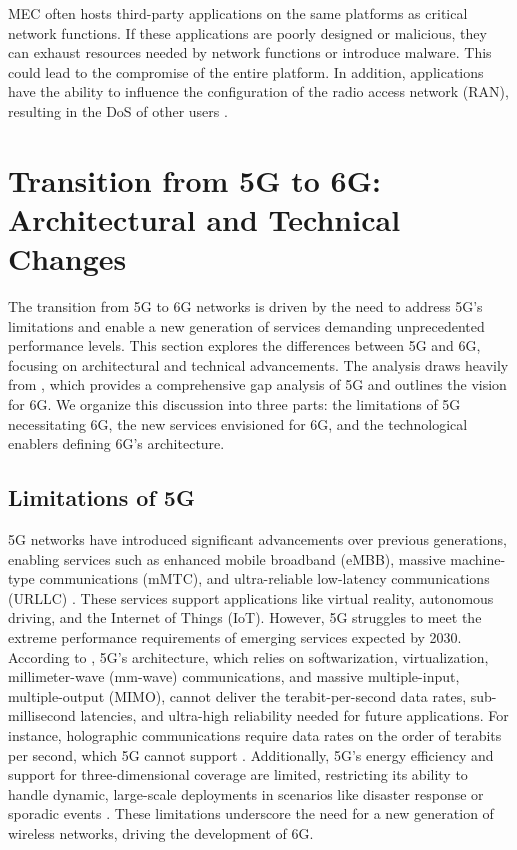 \documentclass[acmtog]{acmart}
\begin{document}
MEC often hosts third-party applications on the same platforms as critical network functions. If these applications are poorly designed or malicious, they can exhaust resources needed by network functions or introduce malware. This could lead to the compromise of the entire platform. In addition, applications have the ability to influence the configuration of the radio access network (RAN), resulting in the DoS of other users \cite{ref3_3}.

\section{Transition from 5G to 6G: Architectural and Technical Changes}

The transition from 5G to 6G networks is driven by the need to address 5G's limitations and enable a new generation of services demanding unprecedented performance levels. This section explores the differences between 5G and 6G, focusing on architectural and technical advancements. The analysis draws heavily from \citet{ref4}, which provides a comprehensive gap analysis of 5G and outlines the vision for 6G. We organize this discussion into three parts: the limitations of 5G necessitating 6G, the new services envisioned for 6G, and the technological enablers defining 6G's architecture.

\subsection{Limitations of 5G}

5G networks have introduced significant advancements over previous generations, enabling services such as enhanced mobile broadband (eMBB), massive machine-type communications (mMTC), and ultra-reliable low-latency communications (URLLC) \citep{ref4}. These services support applications like virtual reality, autonomous driving, and the Internet of Things (IoT). However, 5G struggles to meet the extreme performance requirements of emerging services expected by 2030. According to \citet{ref4}, 5G's architecture, which relies on softwarization, virtualization, millimeter-wave (mm-wave) communications, and massive multiple-input, multiple-output (MIMO), cannot deliver the terabit-per-second data rates, sub-millisecond latencies, and ultra-high reliability needed for future applications. For instance, holographic communications require data rates on the order of terabits per second, which 5G cannot support \citep{ref4_1}. Additionally, 5G's energy efficiency and support for three-dimensional coverage are limited, restricting its ability to handle dynamic, large-scale deployments in scenarios like disaster response or sporadic events \citep{ref4}. These limitations underscore the need for a new generation of wireless networks, driving the development of 6G.
\end{document}
